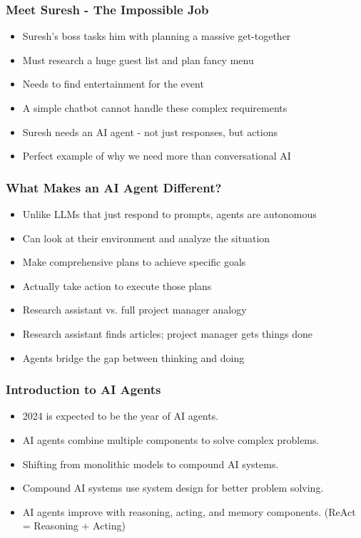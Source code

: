 \begin{frame}[fragile]\frametitle{Meet Suresh - The Impossible Job}
      \begin{itemize}
        \item Suresh's boss tasks him with planning a massive get-together
        \item Must research a huge guest list and plan fancy menu
        \item Needs to find entertainment for the event
        \item A simple chatbot cannot handle these complex requirements
        \item Suresh needs an AI agent - not just responses, but actions
        \item Perfect example of why we need more than conversational AI
      \end{itemize}
\end{frame}

\begin{frame}[fragile]\frametitle{What Makes an AI Agent Different?}
      \begin{itemize}
        \item Unlike LLMs that just respond to prompts, agents are autonomous
        \item Can look at their environment and analyze the situation
        \item Make comprehensive plans to achieve specific goals
        \item Actually take action to execute those plans
        \item Research assistant vs. full project manager analogy
        \item Research assistant finds articles; project manager gets things done
        \item Agents bridge the gap between thinking and doing
      \end{itemize}
\end{frame}

\begin{frame}[fragile]\frametitle{Introduction to AI Agents}
    \begin{itemize}
        \item 2024 is expected to be the year of AI agents.
        \item AI agents combine multiple components to solve complex problems.
        \item Shifting from monolithic models to compound AI systems.
        \item Compound AI systems use system design for better problem solving.
        \item AI agents improve with reasoning, acting, and memory components. (ReAct = Reasoning + Acting)
    \end{itemize}
\end{frame}


